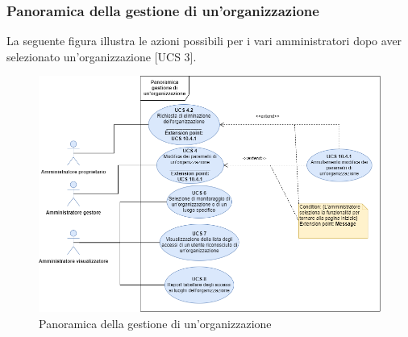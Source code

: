 \newpage
\subsubsection{Panoramica della gestione di un'organizzazione}%
La seguente figura illustra le azioni possibili per i vari amministratori dopo aver selezionato un'organizzazione [UCS 3].
\begin{figure}[h]
	\centering
    \includegraphics[scale=0.53]{Sezioni/UseCase/Immagini/PanoramicaGestioneOrganizzazione.png}
    \caption{Panoramica della gestione di un'organizzazione}
\end{figure}